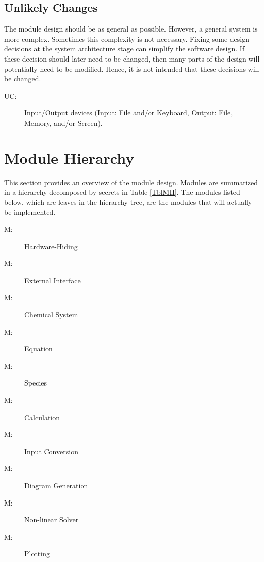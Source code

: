 \documentclass[12pt, titlepage]{article}
\newcounter{ucnum}
\newcommand{\uctheucnum}{UC\theucnum}
\newcounter{mnum}
\newcommand{\mthemnum}{M\themnum}
\begin{document}
\subsection{Unlikely Changes} \label{SecUchange}

The module design should be as general as possible. However, a general system is
more complex. Sometimes this complexity is not necessary. Fixing some design
decisions at the system architecture stage can simplify the software design. If
these decision should later need to be changed, then many parts of the design
will potentially need to be modified. Hence, it is not intended that these
decisions will be changed.

\begin{description}
\item[ \uctheucnum \label{ucIO}:] Input/Output devices
  (Input: File and/or Keyboard, Output: File, Memory, and/or Screen).
\end{description}

\section{Module Hierarchy} \label{SecMH}

This section provides an overview of the module design. Modules are summarized
in a hierarchy decomposed by secrets in Table \ref{TblMH}. The modules listed
below, which are leaves in the hierarchy tree, are the modules that will
actually be implemented.

\begin{description}
\item [ \mthemnum \label{mHH}:] Hardware-Hiding
\item [ \mthemnum \label{mEI}:] External Interface
\item [ \mthemnum \label{mCS}:] Chemical System
\item [ \mthemnum \label{mEP}:] Equation
\item [ \mthemnum \label{mSP}:] Species
\item [ \mthemnum \label{mC}:] Calculation
\item [ \mthemnum \label{mIC}:] Input Conversion
\item [ \mthemnum \label{mDG}:] Diagram Generation
\item [ \mthemnum \label{mNLS}:] Non-linear Solver
\item [ \mthemnum \label{mP}:] Plotting
\end{description}
\end{document}
